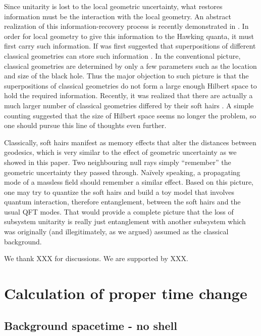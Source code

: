 \documentclass[aps,showpacs,onecolumn,floats,prd,superscriptaddress,nofootinbib]{revtex4-1}
\begin{document}
Since unitarity is lost to the local geometric uncertainty, what restores information must be the interaction with the local geometry. 
An abstract realization of this information-recovery process is recently demonstrated in \cite{OsuPag16}. 
In order for local geometry to give this information to the Hawking quanta, it must first carry such information.
If was first suggested that superpositions of different classical geometries can store such information \cite{NomVar12}.
In the conventional picture, classical geometries are determined by only a few parameters such as the location and size of the black hole.
Thus the major objection to such picture is that the superpositions of classical geometries do not form a large enough Hilbert space to hold the required information.
Recently, it was realized that there are actually a much larger number of classical geometries differed by their soft hairs \cite{HawPer16}.
A simple counting suggested that the size of Hilbert space seems no longer the problem, so one should pursue this line of thoughts even further.

Classically, soft hairs manifest as memory effects that alter the distances between geodesics, which is very similar to the effect of geometric uncertainty as we showed in this paper.
Two neighbouring null rays simply ``remember'' the geometric uncertainty they passed through.
Na\"ively speaking, a propagating mode of a massless field should remember a similar effect. 
Based on this picture, one may try to quantize the soft hairs and build a toy model that involves quantum interaction, therefore entanglement, between the soft hairs and the usual QFT modes.
That would provide a complete picture that the loss of subsystem unitarity is really just entanglement with another subsystem which was originally (and illegitimately, as we argued) assumed as the classical background.

\acknowledgments

We thank XXX for discussions. We are supported by XXX.

\appendix

\section{Calculation of proper time change}
\label{Dtime}

\subsection{Background spacetime - no shell}
\end{document}
